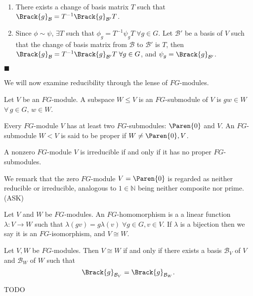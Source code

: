 \documentclass[../Project.tex]{subfiles}
\begin{document}
\begin{proo*}[\cite{2}]~ %
\vspace{-\topsep}
	\begin{enumerate}
		\item There exists a change of basis matrix $T$ such that $\Brack{g}_\mathcal{B} = T^{-1}\Brack{g}_{\mathcal{B}'}T$.
		\item Since $\phi \sim \psi$, $\exists T$ such that $\phi_g = T^{-1}\psi_gT\;\forall g \in G$. Let $\mathcal{B}'$ be a basis of $V$ such that the change of basis matrix from $\mathcal{B}$ to $\mathcal{B}'$ is $T$, then $\Brack{g}_\mathcal{B} = T^{-1}\Brack{g}_{\mathcal{B}'}T\;\forall g \in G$, and $\psi_g = \Brack{g}_{\mathcal{B}'}$.
	\end{enumerate}
	$\blacksquare$
\end{proo*}



We will now examine reducibility through the lense of $FG$-modules.

\begin{defi}
	Let $V$ be an $FG$-module. A subspace $W \leqslant V$ is an $FG$-submodule of $V$ is $gw \in W$ $\forall\,g \in G,\,w \in W$.
\end{defi}

\begin{defi}
	Every $FG$-module $V$ has at least two $FG$-submodules: $\Paren{0}$ and $V$. An $FG$-submodule $W < V$ is said to be proper if $W \neq \Paren{0},V$.
\end{defi}

\begin{defi}[\cite{2}]
A nonzero $FG$-module $V$ is irreducible if and only if it has no proper $FG$-submodules.
\end{defi}

We remark that the zero $FG$-module $V = \Paren{0}$ is regarded as neither reducible or irreducible, analogous to $1 \in \mathbb{N}$ being neither composite nor prime. (ASK)

\begin{defi}
	Let  $V$ and $W$ be $FG$-modules. An $FG$-homomorphism is a a linear function $\lambda : V \to W$ such that $\lambda(gv) = g\lambda(v)\;\forall g \in G, v \in V$. If $\lambda$ is a bijection then we say it is an $FG$-isomorphism, and $V \cong W$.
\end{defi}

\begin{prop}[\cite{2}]
\label{6}
Let $V,W$ be $FG$-modules. Then $V \cong W$ if and only if there exists a basis $\mathcal{B}_V$ of $V$ and $\mathcal{B}_W$ of $W$ such that
$$\Brack{g}_{\mathcal{B}_V} = \Brack{g}_{\mathcal{B}_W}.$$
\end{prop}
\begin{proo*}
TODO
\end{proo*}
\end{document}
